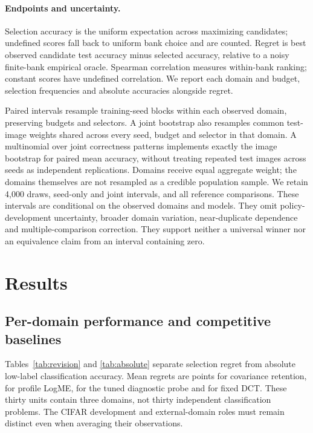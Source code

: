 \documentclass[11pt]{article}
\begin{document}
\paragraph{Endpoints and uncertainty.}
Selection accuracy is the uniform expectation across maximizing candidates; undefined scores fall back to uniform bank choice and are counted. Regret is best observed candidate test accuracy minus selected accuracy, relative to a noisy finite-bank empirical oracle. Spearman correlation measures within-bank ranking; constant scores have undefined correlation. We report each domain and budget, selection frequencies and absolute accuracies alongside regret.

Paired intervals resample training-seed blocks within each observed domain, preserving budgets and selectors. A joint bootstrap also resamples common test-image weights shared across every seed, budget and selector in that domain. A multinomial over joint correctness patterns implements exactly the image bootstrap for paired mean accuracy, without treating repeated test images across seeds as independent replications. Domains receive equal aggregate weight; the domains themselves are not resampled as a credible population sample. We retain 4,000 draws, seed-only and joint intervals, and all reference comparisons. These intervals are conditional on the observed domains and models. They omit policy-development uncertainty, broader domain variation, near-duplicate dependence and multiple-comparison correction. They support neither a universal winner nor an equivalence claim from an interval containing zero.

\section{Results}
\subsection{Per-domain performance and competitive baselines}


Tables~\ref{tab:revision} and \ref{tab:absolute} separate selection regret from absolute low-label classification accuracy. Mean regrets are \RevCovRegret{} points for covariance retention, \RevLogmeRegret{} for profile LogME, \RevTunedRegret{} for the tuned diagnostic probe and \RevFixedRegret{} for fixed DCT. These thirty units contain three domains, not thirty independent classification problems. The CIFAR development and external-domain roles must remain distinct even when averaging their observations.
\end{document}
